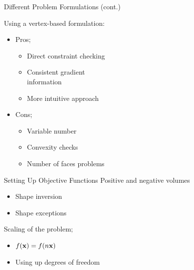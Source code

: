 \documentclass{beamer}
\begin{document}
\begin{frame}{Different Problem Formulations (cont.)}
\begin{figure}
  \quad
  \vfill
  \begin{center}
    \scalebox{0.5}{}
  \end{center}
\end{figure}
Using a vertex-based formulation:
\begin{itemize}
  \item
    Pros;
    \begin{itemize}
      \item
        Direct constraint checking
      \item
        Consistent gradient \\information
      \item
        More intuitive approach
    \end{itemize}
  \item
    Cons;
    \begin{itemize}
      \item
        Variable number
      \item
        Convexity checks
      \item
        Number of faces problems
    \end{itemize}
\end{itemize}
\vfill
\end{frame}

\begin{frame}{Setting Up Objective Functions}
Positive and negative volumes
\begin{itemize}
  \item
    Shape inversion
  \item
    Shape exceptions
\end{itemize}
\vfill
Scaling of the problem;
\begin{itemize}
  \item
    $f({\bf x}) = f(n{\bf x})$
  \item
    Using up degrees of freedom
\end{itemize}
\vfill
\end{frame}
\end{document}
